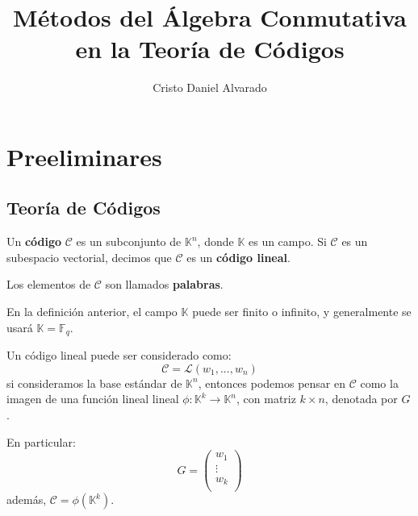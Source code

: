 \documentclass[12pt]{report}
\newcounter{it}
\theoremstyle{largebreak}
\newcommand\cf[3]{\ensuremath{#1:#2\rightarrow#3}}
\newcommand{\gen}[1]{\ensuremath{\mathcal{L}\left(#1 \right)}}
\begin{document}
    \setlength{\parskip}{5pt} %
    \setlength{\parindent}{12pt} %
    \title{Métodos del Álgebra Conmutativa en la Teoría de Códigos}
    \author{Cristo Daniel Alvarado}
    \maketitle

    \tableofcontents %

    \chapter{Preeliminares}

    \section{Teoría de Códigos}

    \begin{mydef}
        Un \textbf{código} $\mathcal{C}$ es un subconjunto de $\mathbb{K}^n$, donde $\mathbb{K}$ es un campo. Si $\mathcal{C}$ es un subespacio vectorial, decimos que $\mathcal{C}$ es un \textbf{código lineal}.

        Los elementos de $\mathcal{C}$ son llamados \textbf{palabras}.
    \end{mydef}

    \begin{obs}
        En la definición anterior, el campo $\mathbb{K}$ puede ser finito o infinito, y generalmente se usará $\mathbb{K}=\mathbb{F}_q$.
    \end{obs}

    \begin{obs}
        Un código lineal puede ser considerado como:
        \begin{equation*}
            \mathcal{C}=\gen{w_1,...,w_n}
        \end{equation*}
        si consideramos la base estándar de $\mathbb{K}^n$, entonces podemos pensar en $\mathcal{C}$ como la imagen de una función lineal lineal $\cf{\phi}{\mathbb{K}^k}{\mathbb{K}^n}$, con matriz $k\times n$, denotada por $G$.

        En particular:
        \begin{equation*}
            G=\left(
                \begin{array}{c}
                    w_1 \\
                    \vdots \\
                    w_k \\
                \end{array}
            \right)
        \end{equation*}
        además, $\mathcal{C}=\phi(\mathbb{K}^k)$.
    \end{obs}
\end{document}
